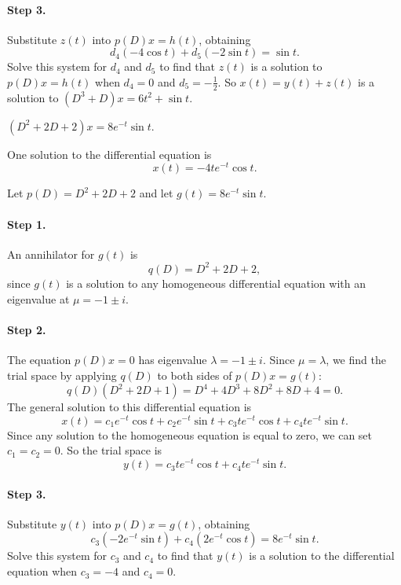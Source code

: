 \documentclass{ximera}
\begin{document}
\begin{exercise}
\begin{solution}
\paragraph{Step 3.} Substitute $z(t)$ into $p(D)x = h(t)$, obtaining
\[
d_4(-4\cos t) + d_5(-2\sin t) = \sin t.
\]
Solve this system for $d_4$ and $d_5$ to find that $z(t)$ is a solution
to $p(D)x = h(t)$ when $d_4 = 0$ and $d_5 = -\frac{1}{2}$.  So $x(t) =
y(t) + z(t)$ is a solution to $(D^3 + D)x = 6t^2 + \sin t$.

\end{solution}
\end{exercise}
\begin{exercise}  \label{c12.4.7}
$(D^2+2D+2)x = 8e^{-t}\sin t$.

\begin{solution}
\ans One solution to the differential equation is
\[
x(t) = -4te^{-t}\cos t.
\]

\soln Let $p(D) = D^2 + 2D + 2$ and let $g(t) = 8e^{-t}\sin t$.
\paragraph{Step 1.} An annihilator for $g(t)$ is
\[
q(D) = D^2 + 2D + 2,
\]
since $g(t)$ is a solution to any homogeneous differential equation
with an eigenvalue at $\mu = -1 \pm i$.

\paragraph{Step 2.} The equation $p(D)x = 0$ has eigenvalue
$\lambda = -1 \pm i$.  Since $\mu = \lambda$, we find the trial space
by applying $q(D)$ to both sides of $p(D)x = g(t)$:
\[
q(D)(D^2 + 2D + 1) = D^4 + 4D^3 + 8D^2 + 8D + 4	= 0.
\]
The general solution to this differential equation is
\[
x(t) = c_1e^{-t}\cos t + c_2e^{-t}\sin t + c_3te^{-t}\cos t +
c_4te^{-t}\sin t.
\]
Since any solution to the homogeneous equation is equal to zero, we can
set $c_1 = c_2 = 0$.  So the trial space is
\[
y(t) = c_3te^{-t}\cos t + c_4te^{-t}\sin t.
\]
\paragraph{Step 3.} Substitute $y(t)$ into $p(D)x = g(t)$, obtaining
\[
c_3(-2e^{-t}\sin t) + c_4(2e^{-t}\cos t) = 8e^{-t}\sin t.
\]
Solve this system for $c_3$ and $c_4$ to find that $y(t)$ is a solution
to the differential equation when $c_3 = -4$ and $c_4 = 0$.

\end{solution}
\end{exercise}
\end{document}
